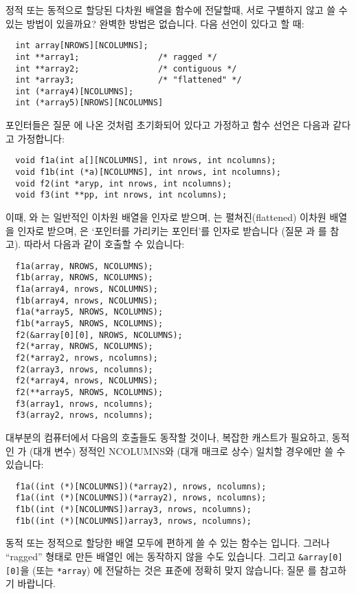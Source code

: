 \begin{faq}
	 정적 또는 동적으로 할당된 다차원 배열을 함수에 전달할때,
	서로 구별하지 않고 쓸 수 있는 방법이 있을까요?
\A	
	완벽한 방법은 없습니다.  다음 선언이 있다고 할 때:
\begin{verbatim}
  int array[NROWS][NCOLUMNS];
  int **array1;                /* ragged */
  int **array2;                /* contiguous */
  int *array3;                 /* "flattened" */
  int (*array4)[NCOLUMNS];
  int (*array5)[NROWS][NCOLUMNS]
\end{verbatim}
	\noindent 포인터들은 질문 에 나온 것처럼 초기화되어 있다고
	가정하고 함수 선언은 다음과 같다고 가정합니다:
\begin{verbatim}
  void f1a(int a[][NCOLUMNS], int nrows, int ncolumns);
  void f1b(int (*a)[NCOLUMNS], int nrows, int ncolumns);
  void f2(int *aryp, int nrows, int ncolumns);
  void f3(int **pp, int nrows, int ncolumns);
\end{verbatim}
	\noindent 이때, 와 는 일반적인 이차원
	배열을 인자로 받으며, 는 펼쳐진(flattened) 이차원
	배열을 인자로 받으며, 은 `포인터를 가리키는 포인터'를
	인자로 받습니다 (질문 과 를 참고).  따라서 다음과 같이
	호출할 수 있습니다:

\begin{verbatim}
  f1a(array, NROWS, NCOLUMNS);
  f1b(array, NROWS, NCOLUMNS);
  f1a(array4, nrows, NCOLUMNS);
  f1b(array4, nrows, NCOLUMNS);
  f1a(*array5, NROWS, NCOLUMNS);
  f1b(*array5, NROWS, NCOLUMNS);
  f2(&array[0][0], NROWS, NCOLUMNS);
  f2(*array, NROWS, NCOLUMNS);
  f2(*array2, nrows, ncolumns);
  f2(array3, nrows, ncolumns);
  f2(*array4, nrows, NCOLUMNS);
  f2(**array5, NROWS, NCOLUMNS);
  f3(array1, nrows, ncolumns);
  f3(array2, nrows, ncolumns);
\end{verbatim}
	대부분의 컴퓨터에서 다음의 호출들도 동작할 것이나, 복잡한
	캐스트가 필요하고, 동적인 가 (대개 변수) 정적인
	NCOLUMNS와 (대개 매크로 상수) 일치할 경우에만 쓸 수 있습니다:

\begin{verbatim}
  f1a((int (*)[NCOLUMNS])(*array2), nrows, ncolumns);
  f1a((int (*)[NCOLUMNS])(*array2), nrows, ncolumns);
  f1b((int (*)[NCOLUMNS])array3, nrows, ncolumns);
  f1b((int (*)[NCOLUMNS])array3, nrows, ncolumns);
\end{verbatim}

	동적 또는 정적으로 할당한 배열 모두에 편하게 쓸 수 있는 함수는
	입니다. 그러나 ``ragged'' 형태로 만든 배열인 에는
	동작하지 않을 수도 있습니다. 그리고 \verb+&array[0][0]+을
	(또는 \verb+*array+) 에 전달하는 것은 표준에
	정확히 맞지 않습니다; 질문 를 참고하기 바랍니다.


\end{faq}
